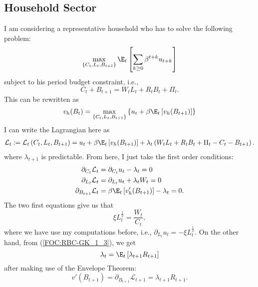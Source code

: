 \documentclass{article}
\begin{document}
	\subsection{Household Sector}
	I am considering a representative household who has to solve the following problem:
	\begin{equation}
		\max_{\{C_t, L_t, B_{t+1}\}} \E_t\left[\sum_{k\geq 0}\beta^{t+k} u_{t+k}\right]
	\end{equation}
	subject to his period budget constraint, i.e.,
	\begin{equation}
		C_t + B_{t+1}  = W_t L_t +R_tB_t + \Pi_t.
	\end{equation}
	This can be rewritten as
	\begin{equation}
		v_h(B_t) = \max_{\{C_t, L_t, B_{t+1}\}}\left\{u_t + \beta\E_t\left[v_h(B_{t+1})\right]\right\}
	\end{equation}
	I can write the Lagrangian here as
	\begin{equation}
		\begin{aligned}
			\mathcal{L}_t := \mathcal{L}_t\left(C_t, L_t, B_{t+1}\right) &= u_t + \beta\E_t\left[v_h(B_{t+1})\right]  + \lambda_{t}\left(W_t L_t + R_t B_t + \Pi_t - C_t - B_{t+1}\right).\\
		\end{aligned}
	\end{equation}
	where $\lambda_{t+1}$ is predictable. From here, I just take the first order conditions:
	\begin{align}
		\partial_{C_t} \mathcal{L}_t & = \partial_{C_t} u_t - \lambda_t = 0\label{FOC:RBC-GK_1_1}\\
		\partial_{L_t} \mathcal{L}_t & = \partial_{L_t} u_t + \lambda_t W_t  = 0\label{FOC:RBC-GK_1_2}\\
		\partial_{B_{t+1}}\mathcal{L}_t & = \beta\E_t\left[v_h'(B_{t+1})\right]-\lambda_t = 0. \label{FOC:RBC-GK_1_3}
	\end{align}
	The two first equations give us that
	\begin{equation}
		\xi L_t^{\frac{1}{\nu}} = \frac{W_t}{C_t},
	\end{equation}
	where we have use my computations before, i.e., $\partial_{L_t}u_t = - \xi L_t^{\frac{1}{\nu}}$. On the other hand, from (\ref{FOC:RBC-GK_1_3}), we get
	\begin{equation}
		\lambda_t = \E_t\left[\lambda_{t+1}R_{t+1}\right]
	\end{equation}
	after making use of the Envelope Theorem:
	\begin{equation}
		v'\left(B_{t+1}\right) = \partial_{B_{t+1}}\mathcal{L}_{t+1} =  \lambda_{t+1}R_{t+1}.
	\end{equation}
\end{document}
